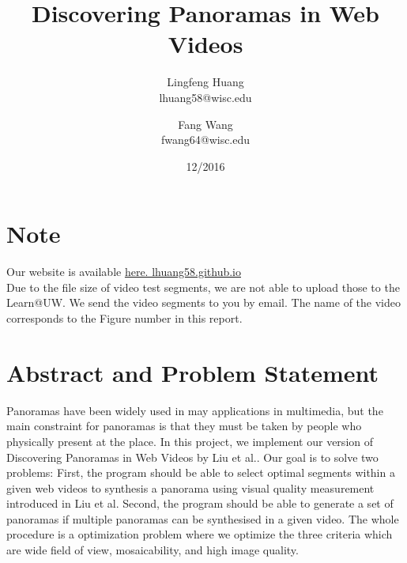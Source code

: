 \documentclass[12pt]{article}
\title{Discovering Panoramas in Web Videos}
\author{Lingfeng Huang \\ lhuang58@wisc.edu 
   \and Fang Wang \\ fwang64@wisc.edu}
\date{12/2016}
\begin{document}
\maketitle

\section*{Note}
Our website is available \href{http://lhuang58.github.io}{here. lhuang58.github.io}\\
Due to the file size of video test segments, we are not able to upload those to the Learn@UW. We send the video segments to you by email. The name of the video corresponds to the Figure number in this report.

\section*{Abstract and Problem Statement}
Panoramas have been widely used in may applications in multimedia, but the main constraint for panoramas is that they must be taken by people who physically present at the place. In this project, we implement our version of Discovering Panoramas in Web Videos by Liu et al.\cite{Liu}. Our goal is to solve two problems: First, the program should be able to select optimal segments within a given web videos to synthesis a panorama using visual quality measurement introduced in Liu et al.\cite{Liu} Second, the program should be able to generate a set of panoramas if multiple panoramas can be synthesised in a given video. 
The whole procedure is a optimization problem where we optimize the three criteria which are wide field of view, mosaicability, and high image quality.
\end{document}
